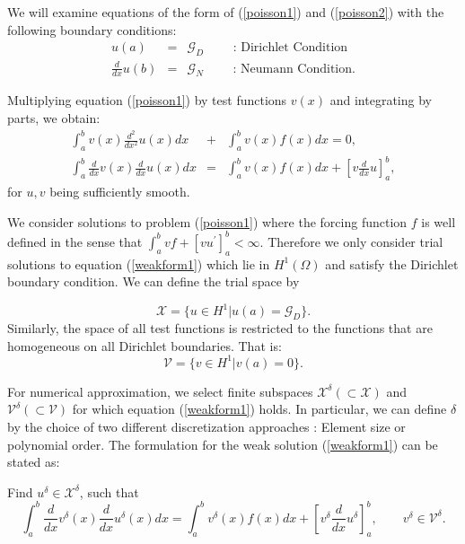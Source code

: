 
We will examine equations of the form of  (\ref{poisson1}) and
(\ref{poisson2}) with the following boundary conditions:
\begin{eqnarray}\label{bdycond}
    u(a) &=& {\mathcal G}_D \qquad \mbox{ : Dirichlet Condition}\\
    \frac{d}{dx}u(b) &=& \mathcal{G}_N \qquad \mbox{ : Neumann Condition}.
\end{eqnarray}

Multiplying equation (\ref{poisson1}) by test functions $v(x)$ and
integrating by parts, we obtain:
\begin{eqnarray}
\int_a^b v(x)\frac{d^2}{dx^2}u(x) dx &+& \int_a^b v(x) f(x) dx = 0,\\
\label{weakform1}
\int_a^b \frac{d}{dx}v(x)\frac{d}{dx}u(x)dx &=& \int_a^b v(x) f(x) dx + \left[v \frac{d}{dx}u\right]_a^b,
\end{eqnarray}
for $u, v$ being sufficiently smooth.



We consider solutions to problem (\ref{poisson1}) where the
forcing function $f$ is well defined in the sense that $\int_a^b v
f + \left[ v u^{\prime} \right]_a^b < \infty$. Therefore we only
consider trial solutions to equation (\ref{weakform1}) which lie
in $H^1(\Omega)$ and satisfy the Dirichlet boundary condition. We
can define the trial space by

\begin{equation}
\mathcal{X} = \{u\in H^1|u(a) = {\mathcal G}_D\}.
\end{equation}
Similarly, the space of all test functions is restricted to the
functions that are homogeneous on all Dirichlet boundaries. That
is:
\begin{equation}
\mathcal{V} = \{v\in H^1|v(a) = 0\}.
\end{equation}

For numerical approximation, we select finite subspaces
$\mathcal{X}^{\delta} (\subset \mathcal{X})$ and
$\mathcal{V}^{\delta} (\subset \mathcal{V})$ for which equation
(\ref{weakform1}) holds. In particular, we can define $\delta$ by
the choice of two different discretization approaches : Element
size or polynomial order. The formulation for the weak solution
(\ref{weakform1}) can be stated as:

Find $u^{\delta} \in \mathcal{X}^{\delta}$, such that
\begin{equation}
\int_a^b \frac{d}{dx}v^{\delta}(x)\frac{d}{dx}u^{\delta}(x)dx = \int_a^b v^{\delta}(x) f(x) dx + \left[v^{\delta} \frac{d}{dx}u^{\delta}\right]_a^b, \qquad v^{\delta} \in \mathcal{V}^{\delta}.
\end{equation}




